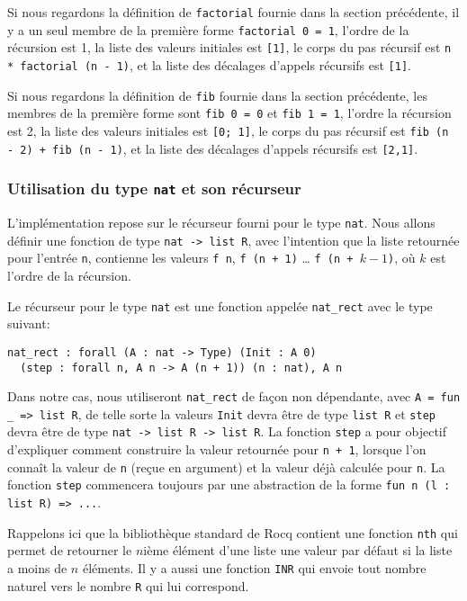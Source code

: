 \documentclass[draft]{jflart}
\begin{document}
Si nous regardons la définition de \texttt{factorial} fournie dans la
section précédente, il y a un seul membre de la première forme
\texttt{factorial 0 = 1}, l'ordre de la récursion est 1,
la liste des valeurs initiales est \texttt{[1]}, le
corps du pas récursif est \texttt{n * factorial (n - 1)}, et la liste
des décalages d'appels récursifs est \texttt{[1]}.

Si nous regardons la définition de \texttt{fib} fournie dans la section
précédente, les membres de la première forme sont \texttt{fib 0 = 0} et
\texttt{fib 1 = 1}, l'ordre la récursion est 2,
la liste des valeurs initiales est \texttt{[0; 1]},
le corps du pas récursif est \texttt{fib (n - 2) + fib (n - 1)}, et
la liste des décalages d'appels récursifs est \texttt{[2,1]}.

\subsubsection{Utilisation du type \texttt{nat} et son récurseur}
L'implémentation repose sur le récurseur fourni pour le type
\texttt{nat}.  Nous allons définir une fonction de type \texttt{nat -> list
  R}, avec l'intention que la liste retournée pour l'entrée \texttt{n},
contienne les valeurs \texttt{f n}, \texttt{f (n + 1)} \dots
\texttt{f (n + \(k - 1\))}, où \(k\) est l'ordre de la récursion.

Le récurseur pour le type \texttt{nat} est une fonction appelée
\texttt{nat\_rect} avec le type suivant:
\begin{verbatim}
nat_rect : forall (A : nat -> Type) (Init : A 0)
  (step : forall n, A n -> A (n + 1)) (n : nat), A n
\end{verbatim}
Dans notre cas, nous utiliseront \texttt{nat\_rect} de façon non
dépendante, avec \texttt{A = fun \_ => list R}, de telle sorte la
valeurs \texttt{Init} devra être de type \texttt{list R} et \texttt{step} devra
être de type \texttt{nat -> list R -> list R}.  La fonction \texttt{step} a
pour objectif d'expliquer comment construire la valeur retournée pour
\texttt{n + 1}, lorsque l'on connaît la valeur de \texttt{n} (reçue en argument)
et la valeur déjà calculée pour \texttt{n}.  La fonction \texttt{step} commencera
toujours par une abstraction de la forme \texttt{fun n (l : list R) => ...}.

Rappelons ici que la bibliothèque standard de Rocq contient une
fonction \texttt{nth} qui permet de retourner le \(n\)ième élément d'une
liste une valeur par défaut si la liste a moins de \(n\) éléments.  Il
y a aussi une fonction \texttt{INR} qui envoie tout nombre naturel vers
le nombre \texttt{R} qui lui correspond.
\end{document}
